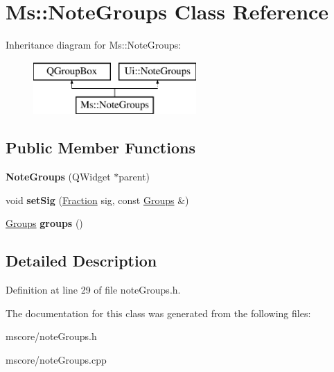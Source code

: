 \hypertarget{class_ms_1_1_note_groups}{}\section{Ms\+:\+:Note\+Groups Class Reference}
\label{class_ms_1_1_note_groups}
Inheritance diagram for Ms\+:\+:Note\+Groups\+:\begin{figure}[H]
\begin{center}
\leavevmode
\includegraphics[height=2.000000cm]{class_ms_1_1_note_groups}
\end{center}
\end{figure}
\subsection*{Public Member Functions}
\begin{DoxyCompactItemize}
\item 
\mbox{\label{class_ms_1_1_note_groups_a0ba54b1c8b4677e58d1d77fbddfd41c3}} 
{\bfseries Note\+Groups} (Q\+Widget $\ast$parent)
\item 
\mbox{\label{class_ms_1_1_note_groups_a34f42332c7db8a472c365f43cbd4ff9c}} 
void {\bfseries set\+Sig} (\hyperlink{class_ms_1_1_fraction}{Fraction} sig, const \hyperlink{class_ms_1_1_groups}{Groups} \&)
\item 
\mbox{\label{class_ms_1_1_note_groups_a31202a5bb6ec4fbc21a86c6525780d2c}} 
\hyperlink{class_ms_1_1_groups}{Groups} {\bfseries groups} ()
\end{DoxyCompactItemize}


\subsection{Detailed Description}


Definition at line 29 of file note\+Groups.\+h.



The documentation for this class was generated from the following files\+:\begin{DoxyCompactItemize}
\item 
mscore/note\+Groups.\+h\item 
mscore/note\+Groups.\+cpp\end{DoxyCompactItemize}

